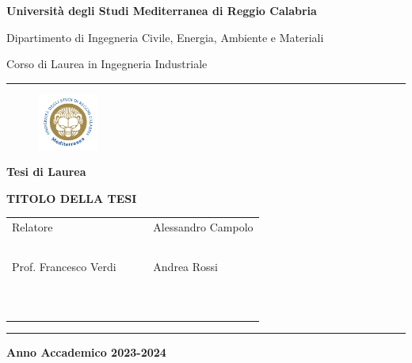 \documentclass[envcountsame,envcountchap]{svmono}
\date{}
\begin{document}
\blinddocument



\frontmatter

\begin{titlepage}

    \begin{center}

    \large{\bf Università degli Studi Mediterranea di Reggio Calabria}

    \vspace*{1mm}

    \large{Dipartimento di Ingegneria Civile, Energia, Ambiente e Materiali}

    \vspace*{1mm}

    \normalsize{Corso di Laurea in Ingegneria Industriale}

    \vspace*{1mm}


    \hspace*{-0mm}

    \rule{125mm}{.2mm}  %


    \vspace{18mm}

    \begin{figure}[h!]
    \centerline{\includegraphics[width=2cm]{logounirc.png}}
    \end{figure}

    \vspace{5mm}

    \textbf{Tesi di Laurea}

    \vspace{5mm}

    \large{\bf TITOLO DELLA TESI }

    \vspace{22mm}

    \begin{tabular}{lcl}
    {\large Relatore} & \ \hskip 4cm \ & {\large Alessandro Campolo} \\
    \ & \ & \ \\
    {Prof. Francesco Verdi} &    & {Andrea Rossi}\\
    \ & \ & \ \\
    \ & \ & \ \\
    \\
    \end{tabular}

    \rule{125mm}{.2mm}

    \textbf{Anno Accademico 2023-2024}
    \end{center}

\end{titlepage}
\end{document}
